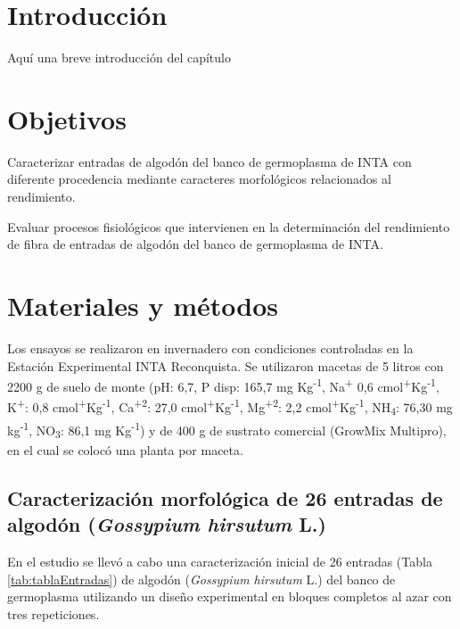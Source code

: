 \documentclass[12pt,oneside]{reedthesis}
\begin{document}
\section{Introducción}\label{introducciuxf3n-1}

Aquí una breve introducción del capítulo\\

\section{Objetivos}\label{objetivos}

Caracterizar entradas de algodón del banco de germoplasma de INTA con diferente procedencia mediante caracteres morfológicos relacionados al rendimiento.

Evaluar procesos fisiológicos que intervienen en la determinación del rendimiento de fibra de entradas de algodón del banco de germoplasma de INTA.

\section{Materiales y métodos}\label{materiales-y-muxe9todos}

Los ensayos se realizaron en invernadero con condiciones controladas en la Estación Experimental INTA Reconquista. Se utilizaron macetas de 5 litros con 2200 g de suelo de monte (pH: 6,7, P disp: 165,7 mg Kg\textsuperscript{-1}, Na\textsuperscript{+} 0,6 cmol\textsuperscript{+}Kg\textsuperscript{-1}, K\textsuperscript{+}: 0,8 cmol\textsuperscript{+}Kg\textsuperscript{-1}, Ca\textsuperscript{+2}: 27,0 cmol\textsuperscript{+}Kg\textsuperscript{-1}, Mg\textsuperscript{+2}: 2,2 cmol\textsuperscript{+}Kg\textsuperscript{-1}, NH\textsubscript{4}: 76,30 mg kg\textsuperscript{-1}, NO\textsubscript{3}: 86,1 mg Kg\textsuperscript{-1}) y de 400 g de sustrato comercial (GrowMix Multipro), en el cual se colocó una planta por maceta.

\subsection{\texorpdfstring{Caracterización morfológica de 26 entradas de algodón (\emph{Gossypium hirsutum} L.)}{Caracterización morfológica de 26 entradas de algodón (Gossypium hirsutum L.)}}\label{caracterizaciuxf3n-morfoluxf3gica-de-26-entradas-de-algoduxf3n-gossypium-hirsutum-l.}

En el estudio se llevó a cabo una caracterización inicial de 26 entradas (Tabla \ref{tab:tablaEntradas}) de algodón (\emph{Gossypium hirsutum} L.) del banco de germoplasma utilizando un diseño experimental en bloques completos al azar con tres repeticiones.
\end{document}
